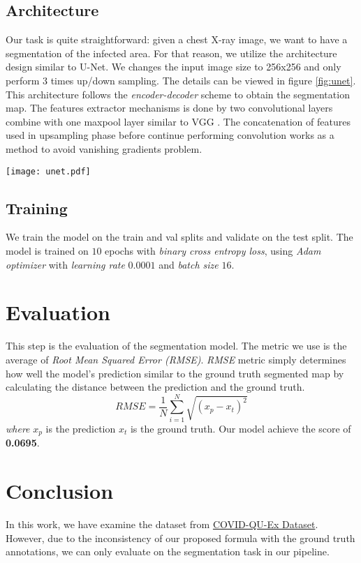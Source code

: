 \documentclass[conference]{IEEEtran}
\begin{document}
\subsection{Architecture}
Our task is quite straightforward: given a chest X-ray image, we want to have a segmentation of the infected area. For that reason, we utilize the architecture design similar to U-Net\cite{Ronneberger2015}. We changes the input image size to 256x256 and only perform 3 times up/down sampling. The details can be viewed in figure \ref{fig:unet}. This architecture follows the \emph{encoder-decoder} scheme to obtain the segmentation map. The features extractor mechanisms is done by two convolutional layers combine with one maxpool layer similar to VGG \cite{Simonyan2015}. The concatenation of features used in upsampling phase before continue  performing convolution works as a method to avoid vanishing gradients problem.
\begin{figure*}
    \centering
    \texttt{[image: unet.pdf]}
    \caption{Model architecture}
    \label{fig:unet}
\end{figure*}

\subsection{Training}
We train the model on the train and val splits and validate on the test split. 
The model is trained on $10$ epochs with \emph{binary cross entropy loss}, using \emph{Adam optimizer} with \emph{learning rate} $0.0001$ and \emph{batch size} $16$.

\section{Evaluation}
This step is the evaluation of the segmentation model. The metric we use is the average of \emph{Root Mean Squared Error (RMSE)}. \emph{RMSE} metric simply determines how well the model's prediction similar to the ground truth segmented map by calculating the distance between the prediction and the ground truth. \[RMSE=\frac{1}{N}\sum_{i=1}^{N}\sqrt{(x_p - x_t)^2}\] \emph{where} $x_p$ is the prediction $x_t$ is the ground truth. Our model achieve the score of \textbf{0.0695}.

\section{Conclusion}
In this work, we have examine the dataset from \href{https://www.kaggle.com/datasets/anasmohammedtahir/covidqu}{COVID-QU-Ex Dataset}. However, due to the inconsistency of our proposed formula with the ground truth annotations, we can only evaluate on the segmentation task in our pipeline.

\printbibliography
\end{document}

